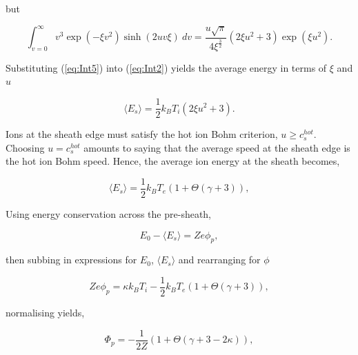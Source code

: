 \documentclass{article}
\begin{document}
\noindent but

\begin{equation}\label{eq:Int5}
\int_{v = 0}^{\infty} v^3\exp{\left(-\xi v^2\right)}\sinh{\left(2uv\xi\right)} \ dv = \frac{u\sqrt{\pi}}{4\xi^{\frac{3}{2}}} 
\left(2\xi u^2 + 3\right) \exp{\left(\xi u^2\right)}.
\end{equation}

\smallskip

\noindent Substituting (\ref{eq:Int5}) into (\ref{eq:Int2}) yields the average energy 
in terms of $\xi$ and $u$ 

\begin{equation}\label{eq:AverageEnergy}
\langle E_{s} \rangle = \frac{1}{2}k_B T_i \left(2\xi u^2 + 3\right).
\end{equation}

Ions at the sheath edge must satisfy the hot ion Bohm criterion, $u \geq c_s^{hot}$. 
Choosing $u = c_s^{hot}$ amounts to saying that the average speed at the sheath edge 
is the hot ion Bohm speed. Hence, the average ion energy at the sheath becomes,

\begin{equation}\label{eq:AverageEnergy2}
\langle E_{s} \rangle = \frac{1}{2}k_B T_e \left(1 + \Theta\left(\gamma + 3\right)\right),
\end{equation}

\smallskip 

Using energy conservation across the pre-sheath,

\begin{equation}\label{eq:EnergyConservation2}
E_0 - \langle E_{s} \rangle = Ze\phi_p,
\end{equation}

\smallskip

\noindent then subbing in expressions for $E_0$, $\langle E_{s} \rangle$ and rearranging for $\phi$

\begin{equation}\label{eq:PS1}
Ze\phi_p = \kappa k_B T_i - \frac{1}{2}k_B T_e \left(1 + \Theta\left(\gamma + 3\right)\right),
\end{equation}
    
\noindent normalising yields,

\begin{equation}\label{eq:PSpotential}
\Phi_p =  - \frac{1}{2Z}\left(1 + \Theta\left(\gamma + 3 -2\kappa\right)\right),
\end{equation}

\smallskip
\end{document}
